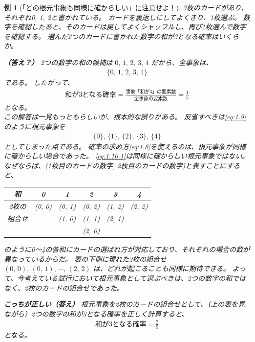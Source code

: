 \documentclass[12pt]{ltjsarticle}\usepackage{ifthen}\newcounter{enlarge}\setcounter{enlarge}{1}
\newtheorem{eg}{例}
\begin{document}
\begin{eg}[「どの根元事象も同様に確からしい」に注意せよ！] \label{eg:1.1}
  3枚のカードがあり、それぞれ0, 1, 2と書かれている。
  カードを裏返しにしてよくきり、1枚選ぶ。
  数字を確認したあと、そのカードは戻してよくシャッフルし、再び1枚選んで数字を確認する。
  選んだ2つのカードに書かれた数字の和が3となる確率はいくらか。

  \textbf{（答え？）}
  2つの数字の和の候補は $0,\, 1,\, 2,\, 3,\, 4$ だから、全事象は、
  \begin{align}
    \{0,\, 1,\, 2,\, 3,\, 4\} \label{eq:1.9}
  \end{align}
  である。
  したがって、
  \begin{align}
    \text{和が3となる確率} = \frac{\text{事象「和が3」の要素数}}{\text{全事象の要素数}} = \frac{1}{5} \label{eq:1.10}
  \end{align}
  となる。\mbox{}\\

  この解答は一見もっともらしいが、根本的な誤りがある。
  反省すべきは\eqref{eq:1.9} のように根元事象を
  \begin{align}
    \{0\},\,\{1\},\,\{2\},\,\{3\},\,\{4\} \label{eq:1.10.1}
  \end{align}
  としてしまった点である。
  確率の求め方\eqref{eq:1.8}を使えるのは、根元事象が同様に確からしい場合であった。
  \eqref{eq:1.10.1}は同様に確からしい根元事象ではない。
  なぜならば、(1枚目のカードの数字, 2枚目のカードの数字)と表すことにすると、
  \begin{center}
  \begin{tabular}{c|ccccc} \hline
    和 & 0 & 1 & 2 & 3 & 4 \\ \hline
    2枚の & (0, 0) & (0, 1) & (0, 2) & (1, 2) & (2, 2) \\
    組合せ &  & (1, 0) & (1, 1) & (2, 1) &  \\
     &  &  & (2, 0) & & \\ \hline
  \end{tabular}
  \end{center}
  のように0〜4の各和にカードの選ばれ方が対応しており、それぞれの場合の数が異なっているからだ。
  表の下側に現れた2枚の組合せ $(0,\, 0),\, (0,\, 1),\, \cdots ,\, (2,\,2)$ は、どれが起こることも同様に期待できる。
  よって、今考えている試行において根元事象として選ぶべきは、2つの数字の和ではなく、2枚のカードの組合せであった。

  \textbf{こっちが正しい（答え）}
  根元事象を2枚のカードの組合せとして、（上の表を見ながら）2つの数字の和が3となる確率を正しく計算すると、
  \begin{align}
    \text{和が3となる確率} = \frac{2}{9} \label{eq:1.10}
  \end{align}
  となる。
\end{eg}
\end{document}
